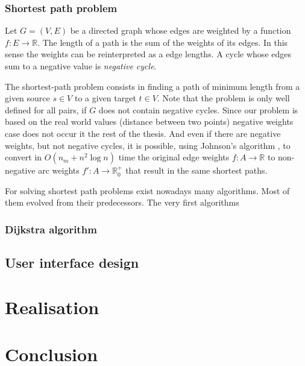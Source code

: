 \documentclass[thesis=M,english]{FITthesis}[2012/10/20]
\begin{document}
\subsection{Shortest path problem}
Let $G = (V, E)$ be a directed graph whose edges are weighted by a function $f: E \to \mathbb{R}$. 
The length of a path is the sum of the weights of its edges. In this sense the weights can be reinterpreted as a edge lengths. A cycle whose edges sum to a negative value is \textit{negative cycle}.  

The shortest-path problem consists in finding a path of minimum length from a given source $s \in V$ to a given target $t \in V$.
Note that the problem is only well defined for all pairs, if $G$ does not contain negative cycles.
Since our problem is based on the real world values (distance between two points) negative weights case does not occur it the rest of the thesis.
And even if there are negative weights, but not negative cycles, it is possible, using Johnson's algorithm \cite{Johnson77}, to convert in $O(n_m + n^2 \log n)$ time the original edge weights $f: A \to \mathbb{R}$ to non-negative arc weights $ f': A \to \mathbb{R}^+_0$ that result in the same shortest paths.

For solving shortest path problems exist nowadays many algorithms. Most of them evolved from their predecessors. The very first algorithms 

\subsection{Dijkstra algorithm}

\section{User interface design}

\chapter{Realisation}

\chapter{Conclusion}





\appendix
\end{document}
